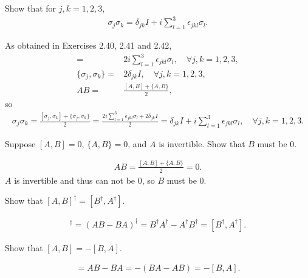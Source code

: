\documentclass[en]{sol-man}
\begin{document}
\begin{exe}
    Show that for $j,k=1,2,3$,
    \begin{align}
        \sigma_j\sigma_k=\delta_{jk}I+i\sum_{l=1}^3\epsilon_{jkl}\sigma_l.
    \end{align}
\end{exe}
\begin{pf}
    As obtained in Exercises 2.40, 2.41 and 2.42,
    \begin{align}
        [\sigma_j,\sigma_k]=&2i\sum_{l=1}^3\epsilon_{jkl}\sigma_l,\quad\forall j,k=1,2,3,\\
        \{\sigma_j,\sigma_k\}=&2\delta_{jk}I,\quad\forall j,k=1,2,3,\\
        AB=&\frac{[A,B]+\{A,B\}}{2},
    \end{align}
    so
    \begin{align}
        \sigma_j\sigma_k=\frac{[\sigma_j,\sigma_k]+\{\sigma_j,\sigma_k\}}{2}=\frac{2i\sum_{l=1}^3\epsilon_{jkl}\sigma_l+2\delta_{jk}I}{2}=\delta_{jk}I+i\sum_{l=1}^3\epsilon_{jkl}\sigma_l,\quad\forall j,k=1,2,3.
    \end{align}
\end{pf}

\begin{exe}
    Suppose $[A,B]=0$, $\{A,B\}=0$, and $A$ is invertible. Show that $B$ must be 0.
\end{exe}
\begin{pf}
    \begin{align}
        AB=\frac{[A,B]+\{A,B\}}{2}=0.
    \end{align}
    $A$ is invertible and thus can not be $0$, so $B$ must be $0$.
\end{pf}

\begin{exe}
    Show that $[A,B]^{\dagger}=[B^{\dagger},A^{\dagger}]$.
\end{exe}
\begin{pf}
    \begin{align}
        [A,B]^{\dagger}=(AB-BA)^{\dagger}=B^{\dagger}A^{\dagger}-A^{\dagger}B^{\dagger}=[B^{\dagger},A^{\dagger}].
    \end{align}
\end{pf}

\begin{exe}
    Show that $[A,B]=-[B,A]$.
\end{exe}
\begin{pf}
    \begin{align}
        [A,B]=AB-BA=-(BA-AB)=-[B,A].
    \end{align}
\end{pf}
\end{document}

